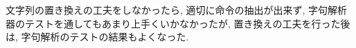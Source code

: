 \documentclass[uplatex,a4j]{jsreport}
\begin{document}
文字列の置き換えの工夫をしなかったら, 適切に命令の抽出が出来ず, 字句解析器のテストを通してもあまり上手くいかなかったが, 
置き換えの工夫を行った後は, 字句解析のテストの結果もよくなった. 

\end{document}
